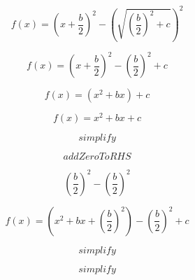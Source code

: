 \documentclass{article}
\begin{document}
\begin{equation}
f(x) = \left(x+ \frac{b}{2}\right)^2 - \left(\sqrt{\left(\frac{b}{2}\right)^2 + c}\right)^2
\iffalse eqmap_equation {"id":"6d60f47e-6466-4585-8832-44e40b39b3a6"} \fi\end{equation}

\begin{equation}
f(x) = \left(x+ \frac{b}{2}\right)^2 - \left(\frac{b}{2}\right)^2 + c
\iffalse eqmap_equation {"id":"389f1446-0cbc-4600-acb8-fa126ef2129b"} \fi\end{equation}

\begin{equation}
f(x) = (x^2+bx)+c
\iffalse eqmap_equation {"id":"3d8a8c28-7aee-496f-b8a3-4271ecdbcf39"} \fi\end{equation}

\begin{equation}
f(x)=x^2+bx+c
\iffalse eqmap_equation {"id":"bc152aad-14c8-4b55-8810-69d732d5742a"} \fi\end{equation}

\begin{equation}
simplify
\iffalse eqmap_equation {"id":"1bfc4e40-96e0-4a11-a341-76b2c7f331f2"} \fi\end{equation}

\begin{equation}
addZeroToRHS
\iffalse eqmap_equation {"id":"ddda42d2-aee3-40bd-afa5-ab83d8c814cd"} \fi\end{equation}

\begin{equation}
\left(\frac{b}{2}\right)^2-\left(\frac{b}{2}\right)^2
\iffalse eqmap_equation {"id":"50af9dab-1f09-491a-91c8-b9f93669f59d"} \fi\end{equation}

\begin{equation}
f(x) = \left(x^2+bx+\left(\frac{b}{2}\right)^2\right)-\left(\frac{b}{2}\right)^2+c
\iffalse eqmap_equation {"id":"d5599cf0-e4f4-445c-a7ee-a6d395fb0563"} \fi\end{equation}

\begin{equation}
simplify
\iffalse eqmap_equation {"id":"b865ede5-837f-4223-bb75-d7eba3036db4"} \fi\end{equation}

\begin{equation}
simplify
\iffalse eqmap_equation {"id":"a1239bd5-08f2-495d-81e5-a947946ea8b1"} \fi\end{equation}
\end{document}

